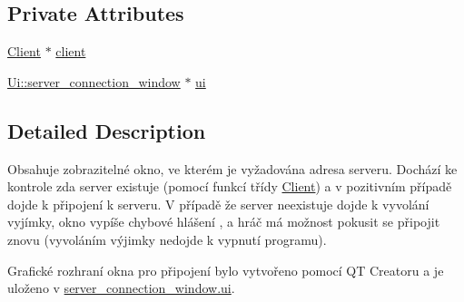 \subsection*{Private Attributes}
\begin{DoxyCompactItemize}
\item 
\hyperlink{classClient}{Client} $\ast$ \hyperlink{classserver__connection__window_aedf2c1c7bec9b66101617dfd75cc61cc}{client}
\item 
\hyperlink{classUi_1_1server__connection__window}{Ui\-::server\-\_\-connection\-\_\-window} $\ast$ \hyperlink{classserver__connection__window_aafa54aec3e044c301c95915b68aae75f}{ui}
\end{DoxyCompactItemize}


\subsection{Detailed Description}
Obsahuje zobrazitelné okno, ve kterém je vyžadována adresa serveru. Dochází ke kontrole zda server existuje (pomocí funkcí třídy \hyperlink{classClient}{Client}) a v pozitivním případě dojde k připojení k serveru. V případě že server neexistuje dojde k vyvolání vyjímky, okno vypíše chybové hlášení , a hráč má možnost pokusit se připojit znovu (vyvoláním výjimky nedojde k vypnutí programu). \par
\par
 Grafické rozhraní okna pro připojení bylo vytvořeno pomocí Q\-T Creatoru a je uloženo v \hyperlink{classserver__connection__window_aafa54aec3e044c301c95915b68aae75f}{server\-\_\-connection\-\_\-window.\-ui}. 

